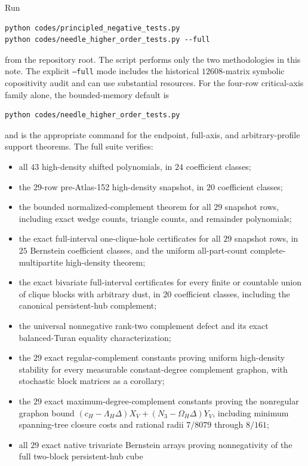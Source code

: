 \documentclass[11pt]{article}
\begin{document}
Run
\begin{verbatim}
python codes/principled_negative_tests.py
python codes/needle_higher_order_tests.py --full
\end{verbatim}
from the repository root.  The script performs only the two methodologies in
this note.  The explicit \texttt{--full} mode includes the historical
$12608$-matrix symbolic copositivity audit and can use substantial resources.
For the four-row critical-axis family alone, the bounded-memory default is
\begin{verbatim}
python codes/needle_higher_order_tests.py
\end{verbatim}
and is the appropriate command for the endpoint, full-axis, and
arbitrary-profile support theorems.  The full suite verifies:
\begin{itemize}
 \item all $43$ high-density shifted polynomials, in $24$ coefficient classes;
 \item the 29-row pre-Atlas-152 high-density snapshot, in $20$ coefficient
 classes;
 \item the bounded normalized-complement theorem for all $29$ snapshot rows,
 including exact wedge counts, triangle counts, and remainder
 polynomials;
 \item the exact full-interval one-clique-hole certificates for all $29$
 snapshot rows, in $25$ Bernstein coefficient classes, and the uniform
 all-part-count complete-multipartite high-density theorem;
 \item the exact bivariate full-interval certificates for every finite or
 countable union of clique blocks with arbitrary dust, in $20$ coefficient
 classes, including the canonical persistent-hub complement;
 \item the universal nonnegative rank-two complement defect and its exact
 balanced-Turan equality characterization;
 \item the $29$ exact regular-complement constants proving uniform
 high-density stability for every measurable constant-degree complement
 graphon, with stochastic block matrices as a corollary;
 \item the $29$ exact maximum-degree-complement constants proving the
 nonregular graphon bound
 $(c_H-\Lambda_H\Delta)X_V+(N_3-\Omega_H\Delta)Y_V$, including minimum
 spanning-tree closure costs and rational radii $7/8079$ through $8/161$;
 \item all $29$ exact native trivariate Bernstein arrays proving
 nonnegativity of the full two-block persistent-hub cube

\end{itemize}
\end{document}
